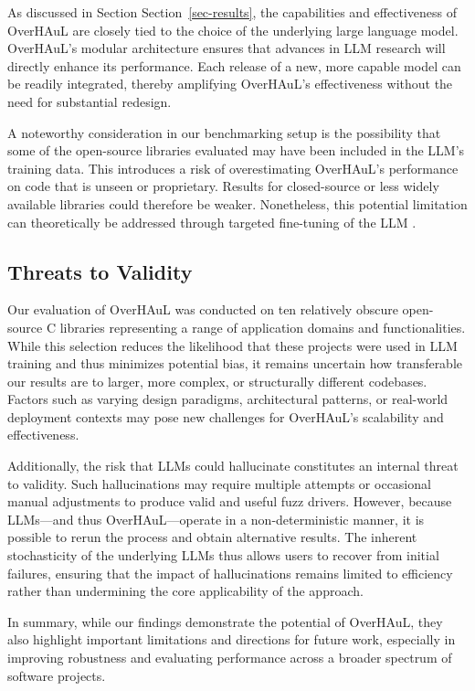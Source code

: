 \documentclass[
  a4paper,
]{scrreprt}
\theoremstyle{definition}
\theoremstyle{remark}
\begin{document}
As discussed in Section Section~\ref{sec-results}, the capabilities and
effectiveness of OverHAuL are closely tied to the choice of the
underlying large language model. OverHAuL's modular architecture ensures
that advances in LLM research will directly enhance its performance.
Each release of a new, more capable model can be readily integrated,
thereby amplifying OverHAuL's effectiveness without the need for
substantial redesign.

A noteworthy consideration in our benchmarking setup is the possibility
that some of the open-source libraries evaluated may have been included
in the LLM's training data. This introduces a risk of overestimating
OverHAuL's performance on code that is unseen or proprietary. Results
for closed-source or less widely available libraries could therefore be
weaker. Nonetheless, this potential limitation can theoretically be
addressed through targeted fine-tuning of the LLM
\autocite{openaidocs2025b,kim2025}.

\subsection{Threats to Validity}\label{threats-to-validity}

Our evaluation of OverHAuL was conducted on ten relatively obscure
open-source C libraries representing a range of application domains and
functionalities. While this selection reduces the likelihood that these
projects were used in LLM training and thus minimizes potential bias, it
remains uncertain how transferable our results are to larger, more
complex, or structurally different codebases. Factors such as varying
design paradigms, architectural patterns, or real-world deployment
contexts may pose new challenges for OverHAuL's scalability and
effectiveness.

Additionally, the risk that LLMs could hallucinate constitutes an
internal threat to validity. Such hallucinations may require multiple
attempts or occasional manual adjustments to produce valid and useful
fuzz drivers. However, because LLMs---and thus OverHAuL---operate in a
non-deterministic manner, it is possible to rerun the process and obtain
alternative results. The inherent stochasticity of the underlying LLMs
thus allows users to recover from initial failures, ensuring that the
impact of hallucinations remains limited to efficiency rather than
undermining the core applicability of the approach.

In summary, while our findings demonstrate the potential of OverHAuL,
they also highlight important limitations and directions for future
work, especially in improving robustness and evaluating performance
across a broader spectrum of software projects.
\end{document}
